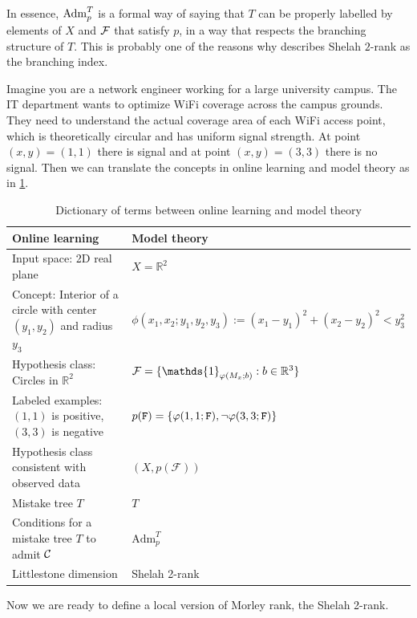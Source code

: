 In essence, $\operatorname{Adm}^{T}_{p}$ is a formal way of saying that $T$ can be properly labelled by elements of $X$ and $\mathcal{F}$ that satisfy $p$, in a way that respects the branching structure of $T$. This is probably one of the reasons why \cite{hodges} describes Shelah $2$-rank as the branching index. 

\begin{example}
    Imagine you are a network engineer working for a large university campus. The IT department wants to optimize WiFi coverage across the campus grounds. They need to understand the actual coverage area of each WiFi access point, which is theoretically circular and has uniform signal strength. At point $(x,y)=(1,1)$ there is signal and at point $(x,y)=(3,3)$ there is no signal. Then we can translate the concepts in online learning and model theory as in \cref{tab:translation}.
    \begin{table}[h]
    \centering
        \begin{tabular}{p{}|p{}}
        \textbf{Online learning} & \textbf{Model theory} \\
        \hline
        Input space: 2D real plane & $X = \mathbb{R}^2$ \\
        Concept: Interior of a circle with center $(y_1,y_2)$ and radius $y_3$ & $\phi(x_1,x_2;y_1,y_2,y_3) := (x_1-y_1)^2 + (x_2-y_2)^2 < y_3^2$ \\
        Hypothesis class: Circles in $\mathbb{R}^2$ & $\cF = \{\mathds{1}_{\phi(M_x;b)} : b \in \R^3\}$ \\
        Labeled examples: $(1,1)$ is positive, $(3,3)$ is negative & $p(\texttt{F}) = \{\varphi(1,1;\texttt{F}), \neg\varphi(3,3;\texttt{F})\}$ \\
        Hypothesis class consistent with observed data & $(X, p(\mathcal{F}))$ \\
        Mistake tree $T$ & $T$ \\
        Conditions for a mistake tree $T$ to admit $\mathcal{C}$ & $\text{Adm}_p^T$ \\
        Littlestone dimension & Shelah 2-rank
        \end{tabular}
    \caption{Dictionary of terms between online learning and model theory}
    \label{tab:translation}
    \end{table}
\end{example}

Now we are ready to define a local version of Morley rank, the Shelah 2-rank.

